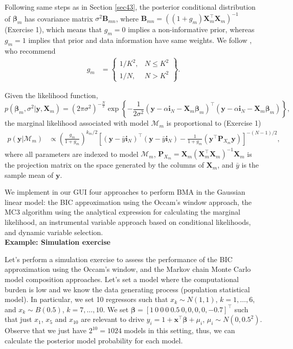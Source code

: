 Following same steps as in Section \ref{sec43}, the posterior conditional distribution of $\bm{\beta}_m$ has covariance matrix $\sigma^2\bm{B}_{mn}$, where $\bm{B}_{mn}=((1+g_m)\bm{X}_m^{\top}\bm{X}_m)^{-1}$ (Exercise 1), which means that $g_m=0$ implies a non-informative prior, whereas $g_m=1$ implies that prior and data information have same weights. We follow \cite{fernandez2001benchmark}, who recommend
\begin{align*}
	g_m & =
	\begin{Bmatrix}
		1/K^2, & N \leq K^2\\
		1/N, & N>K^2 
	\end{Bmatrix}.
\end{align*}  
 
Given the likelihood function, 
\begin{equation*}
	p(\bm{\beta}_m, \sigma^2|\bm{y}, \bm{X}_m) = (2\pi\sigma^2)^{-\frac{N}{2}} \exp \left\{-\frac{1}{2\sigma^2} (\bm{y} - \alpha\bm{i}_N - \bm{X}_m\bm{\beta}_m)^{\top}(\bm{y} - \alpha\bm{i}_N - \bm{X}_m\bm{\beta}_m) \right\},
\end{equation*}
the marginal likelihood associated with model $\mathcal{M}_m$ is proportional to (Exercise 1) 
\begin{align*}
	p(\bm{y}|\mathcal{M}_m)&\propto \left(\frac{g_m}{1+g_m}\right)^{k_m/2} \left[(\bm{y}-\bar{y}\bm{i}_N)^{\top}(\bm{y}-\bar{y}\bm{i}_N)-\frac{1}{1+g_m}(\bm{y}^{\top}\bm{P}_{X_m}\bm{y})\right]^{-(N-1)/2},
\end{align*}
where all parameters are indexed to model $\mathcal{M}_m$, $\bm{P}_{X_m}=\bm{X}_m(\bm{X}_m^{\top}\bm{X}_m)^{-1}\bm{X}_m$ is the projection matrix on the space generated by the columns of $\bm{X}_m$, and $\bar{y}$ is the sample mean of $\bm{y}$.

We implement in our GUI four approaches to perform BMA in the Gaussian linear model: the BIC approximation using the Occam's window approach, the MC3 algorithm using the analytical expression for calculating the marginal likelihood, an instrumental variable approach based on conditional likelihoods, and dynamic variable selection.\\

\textbf{Example: Simulation exercise}

Let's perform a simulation exercise to assess the performance of the BIC approximation using the Occam's window, and the Markov chain Monte Carlo model composition approaches. Let's set a model where the computational burden is low and we know the data generating process (population statistical model). In particular, we set 10 regressors such that $x_k\sim N(1, 1)$, $k =1,\dots,6$, and $x_k\sim B(0.5)$, $k=7,\dots,10$. We set $\bm{\beta}=[1 \ 0 \ 0 \ 0 \ 0.5 \ 0, 0, 0, 0, -0.7]^{\top}$ such that just $x_1$, $x_5$ and $x_{10}$ are relevant to drive $y_i=1+\bm{x}^{\top}\bm{\beta}+\mu_i$, $\mu_i\sim N(0,0.5^2)$. Observe that we just have $2^{10}=1024$ models in this setting, thus, we can calculate the posterior model probability for each model. 

